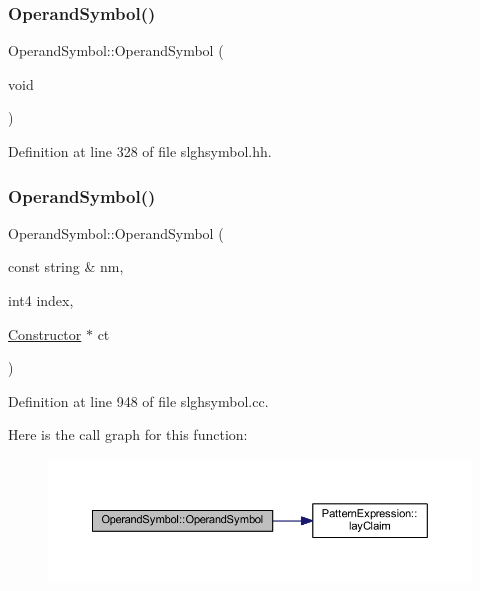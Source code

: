 \subsubsection{\texorpdfstring{OperandSymbol()}{OperandSymbol()}\hspace{0.1cm}{\footnotesize\ttfamily [1/2]}}
{\footnotesize\ttfamily Operand\+Symbol\+::\+Operand\+Symbol (\begin{DoxyParamCaption}\item[{void}]{ }\end{DoxyParamCaption})\hspace{0.3cm}{\ttfamily [inline]}}



Definition at line 328 of file slghsymbol.\+hh.

\mbox{\label{class_operand_symbol_a034b58e5d1eedcfeee9f85ea699ac56a}} 
\subsubsection{\texorpdfstring{OperandSymbol()}{OperandSymbol()}\hspace{0.1cm}{\footnotesize\ttfamily [2/2]}}
{\footnotesize\ttfamily Operand\+Symbol\+::\+Operand\+Symbol (\begin{DoxyParamCaption}\item[{const string \&}]{nm,  }\item[{int4}]{index,  }\item[{\mbox{\hyperlink{class_constructor}{Constructor}} $\ast$}]{ct }\end{DoxyParamCaption})}



Definition at line 948 of file slghsymbol.\+cc.

Here is the call graph for this function\+:
\nopagebreak
\begin{figure}[H]
\begin{center}
\leavevmode
\includegraphics[width=350pt]{class_operand_symbol_a034b58e5d1eedcfeee9f85ea699ac56a_cgraph}
\end{center}
\end{figure}
\mbox{\label{class_operand_symbol_a1949a4b5a8e32481e7b4e01a7ff226b1}} 
